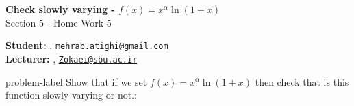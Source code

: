 	






		\begin{Large}
		\textsf{\textbf{Check slowly varying - $f(x) = x^\alpha \ln(1+x)$}}\\
		Section 5 - Home Work 5
	\end{Large}
	
	\vspace{1ex}
	
	\textsf{\textbf{Student:}} , \href{mailto:mehrab.atighi@gmail.com}{\texttt{mehrab.atighi@gmail.com}}\\
	\textsf{\textbf{Lecturer:}} , \href{mailto:Zokaei@sbu.ac.ir}{\texttt{Zokaei@sbu.ac.ir}}
	
	
	\vspace{2ex}
	
	\begin{problem}{}{problem-label}
		Show that if we set $f(x) = x^\alpha \ln(1+x)$ then check that is this function slowly varying or not.\cite{Embrechts.etal1997}:
	\end{problem}
	
